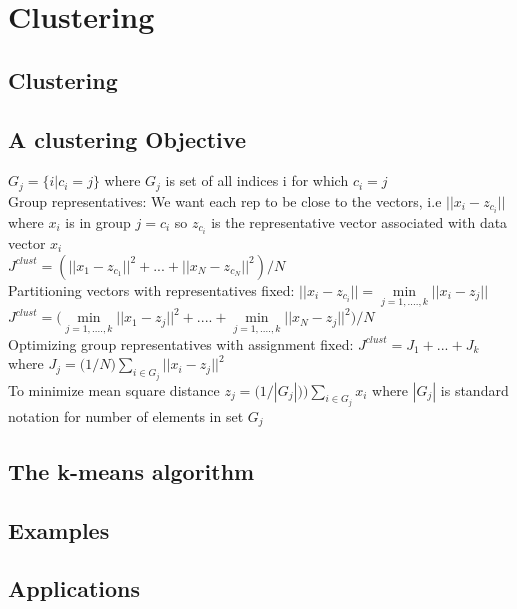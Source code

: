 \section{Clustering}

\subsection{Clustering}
\subsection{A clustering Objective}
$G_{j}= \{ i| c_{i}=j \}$ where $G_{j}$ is set of all indices i for which $c_{i}=j$\\
Group representatives: We want each rep to be close to the vectors, i.e $||x_{i}-z_{c_{i}}||$ where $x_{i}$ is in group $j=c_{i}$ so $z_{c_{i}}$ is the representative vector associated with data vector $x_{i}$ \\ 
$J^{clust}=(||x_{1}-z_{c_{1}}||^2 + ...+||x_{N}-z_{c_{N}}||^2)/N$\\
Partitioning vectors with representatives fixed: $||x_{i}-z_{c_{i}}||=\min\limits_{j=1,....,k} ||x_{i}-z_{j}||$\\
$J^{clust}=\Big(\min\limits_{j=1,....,k} ||x_{1}-z_{j}||^{2}+....+\min\limits_{j=1,....,k} ||x_{N}-z_{j}||^{2}\Big)/N$\\
Optimizing group representatives with assignment fixed: $J^{clust}=J_{1}+...+J_{k}$ where $J_{j}=\big(1/N\big)\sum\limits_{i\in G_{j}}||x_{i}-z_{j}||^{2}$\\
To minimize mean square distance $z_{j}=\big(1/|G_{j}|\big))\sum\limits_{i\in G_{j}}x_{i}$ where $|G_{j}|$ is standard notation for number of elements in set $G_{j}$
\subsection{The k-means algorithm}
\subsection{Examples}
\subsection{Applications}


